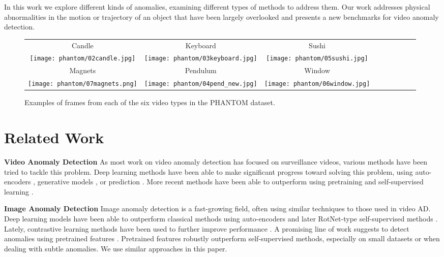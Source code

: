 \documentclass{article}
\begin{document}
In this work we explore different kinds of anomalies, examining different types of methods to address them. Our work addresses physical abnormalities in the motion or trajectory of an object that have been largely overlooked and presents a new benchmarks for video anomaly detection.


\begin{figure}[t]
\begin{center}
\begin{tabular}{@{\hskip0pt}c@{\hskip5pt}c@{\hskip5pt}c@{\hskip5pt}c@{\hskip5pt}c@{\hskip5pt}c@{\hskip0pt}c@{\hskip0pt}c@{\hskip0pt}c}

Candle & Keyboard & Sushi  \\

\texttt{[image: phantom/02candle.jpg]} &
\texttt{[image: phantom/03keyboard.jpg]} &
\texttt{[image: phantom/05sushi.jpg]} &
\\
Magnets & Pendulum & Window \\

\texttt{[image: phantom/07magnets.png]} &
\texttt{[image: phantom/04pend\_new.jpg]} &
\texttt{[image: phantom/06window.jpg]} &
\\

\end{tabular}
\end{center}
\caption{Examples of frames from each of the six video types in the PHANTOM dataset.}
\label{fig:ffhq}
\vspace{-1em}
\end{figure}

\section{Related Work}
\label{sec:related_works}
\textbf{Video Anomaly Detection}
As most work on video anomaly detection has focused on surveillance videos, various methods have been tried to tackle this problem. Deep learning methods have been able to make significant progress toward solving this problem, using auto-encoders \cite{ionescu2019object,gong2019memorizing}, generative models \cite{hasan2016learning}, or prediction \cite{lee2019bman}. More recent methods have been able to outperform using pretraining and self-supervised learning \cite{pang2020self,georgescu2021anomaly,park2020learning}.

\textbf{Image Anomaly Detection}
Image anomaly detection is a fast-growing field, often using similar techniques to those used in video AD. Deep learning models have been able to outperform classical methods using auto-encoders and later RotNet-type self-supervised methods \cite{hendrycks2019using,bergman2020deep}. Lately, contrastive learning methods have been used to further improve performance \cite{tack2020csi,reiss2021mean}. A promising line of work suggests to detect anomalies using pretrained  features \cite{reiss2021mean,reiss2021panda}. Pretrained features robustly outperform self-supervised methods, especially on small datasets or when dealing with subtle anomalies. We use similar approaches in this paper.
\end{document}
